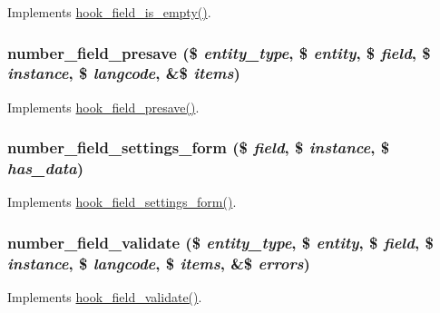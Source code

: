\label{number_8module_a111e78cb87246af587a6266b3c001f0b}
Implements \hyperlink{group__field__types_ga192dd7e7a02a7bc9e0af8b67b187b071}{hook\_\-field\_\-is\_\-empty()}. \hypertarget{number_8module_a0574f4c4143a2ce871f28e348cde0683}{
\subsubsection[{number\_\-field\_\-presave}]{\setlength{\rightskip}{0pt plus 5cm}number\_\-field\_\-presave (\$ {\em entity\_\-type}, \/  \$ {\em entity}, \/  \$ {\em field}, \/  \$ {\em instance}, \/  \$ {\em langcode}, \/  \&\$ {\em items})}}
\label{number_8module_a0574f4c4143a2ce871f28e348cde0683}
Implements \hyperlink{group__field__types_ga5ab3a9e3c8ebccb8ca151790ec07809d}{hook\_\-field\_\-presave()}. \hypertarget{number_8module_aad816feb169b3cdfa058359dd47a7cc7}{
\subsubsection[{number\_\-field\_\-settings\_\-form}]{\setlength{\rightskip}{0pt plus 5cm}number\_\-field\_\-settings\_\-form (\$ {\em field}, \/  \$ {\em instance}, \/  \$ {\em has\_\-data})}}
\label{number_8module_aad816feb169b3cdfa058359dd47a7cc7}
Implements \hyperlink{group__field__types_gab8a2ed808857cc6f3cb661fbc99d30d4}{hook\_\-field\_\-settings\_\-form()}. \hypertarget{number_8module_a6d65c96588f80687db59b498ed16c686}{
\subsubsection[{number\_\-field\_\-validate}]{\setlength{\rightskip}{0pt plus 5cm}number\_\-field\_\-validate (\$ {\em entity\_\-type}, \/  \$ {\em entity}, \/  \$ {\em field}, \/  \$ {\em instance}, \/  \$ {\em langcode}, \/  \$ {\em items}, \/  \&\$ {\em errors})}}
\label{number_8module_a6d65c96588f80687db59b498ed16c686}
Implements \hyperlink{group__field__types_gaa7d8846e8fe3766e1b3435cd50b965be}{hook\_\-field\_\-validate()}.

